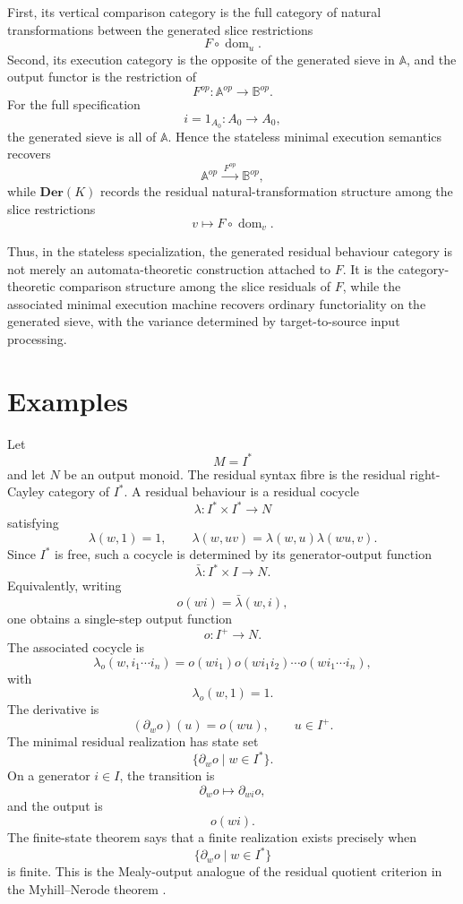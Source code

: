 First, its vertical comparison category is the full category of natural transformations between the generated slice restrictions
\[
    F\circ\operatorname{dom}_u.
\]
Second, its execution category is the opposite of the generated sieve in \(\mathbb A\), and the output functor is the restriction of
\[
    F^{op}:\mathbb A^{op}\to\mathbb B^{op}.
\]
For the full specification
\[
    i=1_{A_0}:A_0\to A_0,
\]
the generated sieve is all of \(\mathbb A\). Hence the stateless minimal execution semantics recovers
\[
    \mathbb A^{op}
        \xrightarrow{\;F^{op}\;}
    \mathbb B^{op},
\]
while \(\mathbf{Der}(K)\) records the residual natural-transformation
structure among the slice restrictions
\[
    v\longmapsto F\circ\operatorname{dom}_v.
\]

Thus, in the stateless specialization, the generated residual behaviour category is not merely an automata-theoretic construction attached to \(F\). It is the category-theoretic comparison structure among the slice residuals of \(F\), while the associated minimal execution machine recovers ordinary functoriality on the generated sieve, with the variance determined by target-to-source input processing.

\section{Examples}
\label{sec:behaviour-myhill-nerode-examples}

\begin{example}
\label{ex:classical-deterministic-mealy-machines}
    Let
    \[
        M=I^*
    \]
    and let \(N\) be an output monoid. The residual syntax fibre is the residual right-Cayley category of \(I^*\). A residual behaviour is a residual cocycle
    \[
        \lambda:I^*\times I^*\to N
    \]
    satisfying
    \[
        \lambda(w,1)=1,
        \qquad
        \lambda(w,uv)=\lambda(w,u)\lambda(wu,v).
    \]
    Since \(I^*\) is free, such a cocycle is determined by its generator-output function
    \[
        \bar\lambda:I^*\times I\to N.
    \]
    Equivalently, writing
    \[
        o(wi)=\bar\lambda(w,i),
    \]
    one obtains a single-step output function
    \[
        o:I^+\to N.
    \]
    The associated cocycle is
    \[
        \lambda_o(w,i_1\cdots i_n)
        =
        o(wi_1)o(wi_1i_2)\cdots o(wi_1\cdots i_n),
    \]
    with
    \[
        \lambda_o(w,1)=1.
    \]
    The derivative is
    \[
        (\partial_w o)(u)=o(wu),
        \qquad
        u\in I^+.
    \]
    The minimal residual realization has state set
    \[
        \{\partial_w o\mid w\in I^*\}.
    \]
    On a generator \(i\in I\), the transition is
    \[
        \partial_w o\longmapsto\partial_{wi}o,
    \]
    and the output is
    \[
        o(wi).
    \]
    The finite-state theorem says that a finite realization exists precisely when
    \[
        \{\partial_w o\mid w\in I^*\}
    \]
    is finite. This is the Mealy-output analogue of the residual quotient criterion in the Myhill--Nerode theorem \cite{Myhill1957,Nerode1958,Brzozowski1964}.
\end{example}

